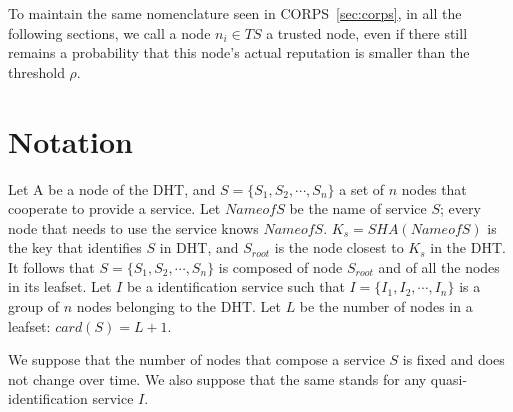 To maintain the same nomenclature seen in CORPS~\ref{sec:corps}, in all the following sections,
we call a node $n_i \in TS$ a trusted node, even if there still remains a
probability that this node's actual reputation is smaller than the threshold
$\rho$.

\section{Notation}

Let A be a node of the DHT, and $S = \{S_1, S_2, \cdots, S_n\}$ a set of $n$
nodes that cooperate to provide a service. Let $NameofS$ be the name of service
$S$; every node that needs to use the service knows $NameofS$. $K_s =
SHA(NameofS)$ is the key that identifies $S$ in DHT, and $S_{root}$ is the node
closest to $K_s$ in the DHT. It follows that $S = \{S_1, S_2, \cdots, S_n\}$ is
composed of node $S_{root}$ and of all the nodes in its leafset. Let $I$ be a
identification service such that $I = \{ I_1, I_2, \cdots, I_n\}$ is a group of
$n$ nodes belonging to the DHT. Let $L$ be the number of nodes in a
leafset: $card(S) = L + 1$.



We suppose that the number of nodes that compose a service $S$ is fixed and does
not change over time. We also suppose that the same stands for any
quasi-identification service $I$.
